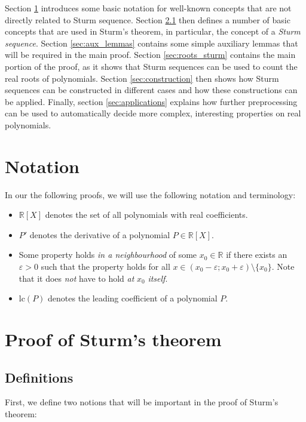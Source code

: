 \documentclass[11pt,a4paper,oneside]{article}
\newcommand{\RR}{\mathbb{R}}
\renewcommand{\epsilon}{\varepsilon}
\begin{document}
Section \ref{sec:notation} introduces some basic notation for well-known concepts that are not directly related to Sturm sequence. Section \ref{sec:defs} then defines a number of basic concepts that are used in Sturm's theorem, in particular, the concept of a \emph{Sturm sequence}. Section \ref{sec:aux_lemmas} contains some simple auxiliary lemmas that will be required in the main proof. Section \ref{sec:roots_sturm} contains the main portion of the proof, as it shows that Sturm sequences can be used to count the real roots of polynomials. Section \ref{sec:construction} then shows how Sturm sequences can be constructed in different cases and how these constructions can be applied. Finally, section \ref{sec:applications} explains how further preprocessing can be used to automatically decide more complex, interesting properties on real polynomials.

\section{Notation}
\label{sec:notation}
In our the following proofs, we will use the following notation and terminology:
\begin{itemize}
\item $\RR[X]$ denotes the set of all polynomials with real coefficients.
\item $P'$ denotes the derivative of a polynomial $P\in\RR[X]$.
\item Some property holds \emph{in a neighbourhood} of some $x_0\in\RR$ if there exists an $\epsilon > 0$ such that the property holds for all $x\in (x_0-\epsilon;x_0+\epsilon)\setminus\{x_0\}$. Note that it does \emph{not} have to hold \emph{at} $x_0$ \emph{itself}.
\item $\mathrm{lc}(P)$ denotes the leading coefficient of a polynomial $P$.
\end{itemize}


\newpage
\section{Proof of Sturm's theorem}

\subsection{Definitions}
\label{sec:defs}

First, we define two notions that will be important in the proof of Sturm's theorem:
\end{document}
